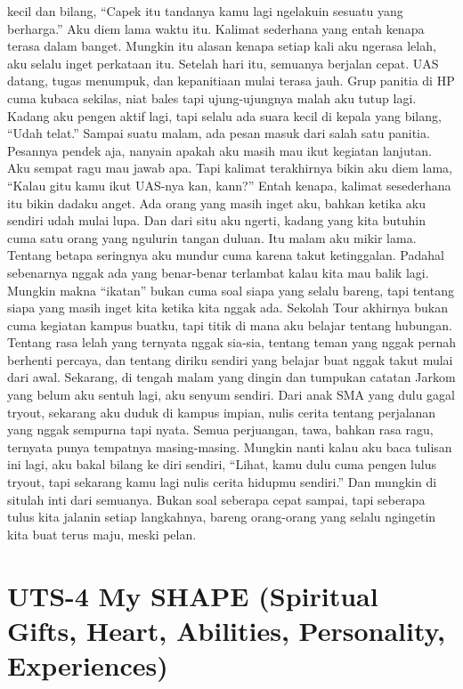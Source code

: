 \documentclass[
  letterpaper,
  DIV=11,
  numbers=noendperiod]{scrreprt}
\begin{document}
kecil dan bilang, ``Capek itu tandanya kamu lagi ngelakuin sesuatu yang
berharga.'' Aku diem lama waktu itu. Kalimat sederhana yang entah kenapa
terasa dalam banget. Mungkin itu alasan kenapa setiap kali aku ngerasa
lelah, aku selalu inget perkataan itu. Setelah hari itu, semuanya
berjalan cepat. UAS datang, tugas menumpuk, dan kepanitiaan mulai terasa
jauh. Grup panitia di HP cuma kubaca sekilas, niat bales tapi
ujung-ujungnya malah aku tutup lagi. Kadang aku pengen aktif lagi, tapi
selalu ada suara kecil di kepala yang bilang, ``Udah telat.'' Sampai
suatu malam, ada pesan masuk dari salah satu panitia. Pesannya pendek
aja, nanyain apakah aku masih mau ikut kegiatan lanjutan. Aku sempat
ragu mau jawab apa. Tapi kalimat terakhirnya bikin aku diem lama,
``Kalau gitu kamu ikut UAS-nya kan, kann?'' Entah kenapa, kalimat
sesederhana itu bikin dadaku anget. Ada orang yang masih inget aku,
bahkan ketika aku sendiri udah mulai lupa. Dan dari situ aku ngerti,
kadang yang kita butuhin cuma satu orang yang ngulurin tangan duluan.
Itu malam aku mikir lama. Tentang betapa seringnya aku mundur cuma
karena takut ketinggalan. Padahal sebenarnya nggak ada yang benar-benar
terlambat kalau kita mau balik lagi. Mungkin makna ``ikatan'' bukan cuma
soal siapa yang selalu bareng, tapi tentang siapa yang masih inget kita
ketika kita nggak ada. Sekolah Tour akhirnya bukan cuma kegiatan kampus
buatku, tapi titik di mana aku belajar tentang hubungan. Tentang rasa
lelah yang ternyata nggak sia-sia, tentang teman yang nggak pernah
berhenti percaya, dan tentang diriku sendiri yang belajar buat nggak
takut mulai dari awal. Sekarang, di tengah malam yang dingin dan
tumpukan catatan Jarkom yang belum aku sentuh lagi, aku senyum sendiri.
Dari anak SMA yang dulu gagal tryout, sekarang aku duduk di kampus
impian, nulis cerita tentang perjalanan yang nggak sempurna tapi nyata.
Semua perjuangan, tawa, bahkan rasa ragu, ternyata punya tempatnya
masing-masing. Mungkin nanti kalau aku baca tulisan ini lagi, aku bakal
bilang ke diri sendiri, ``Lihat, kamu dulu cuma pengen lulus tryout,
tapi sekarang kamu lagi nulis cerita hidupmu sendiri.'' Dan mungkin di
situlah inti dari semuanya. Bukan soal seberapa cepat sampai, tapi
seberapa tulus kita jalanin setiap langkahnya, bareng orang-orang yang
selalu ngingetin kita buat terus maju, meski pelan.


\chapter{UTS-4 My SHAPE (Spiritual Gifts, Heart, Abilities, Personality,
Experiences)}\label{uts-4-my-shape-spiritual-gifts-heart-abilities-personality-experiences}
\end{document}
